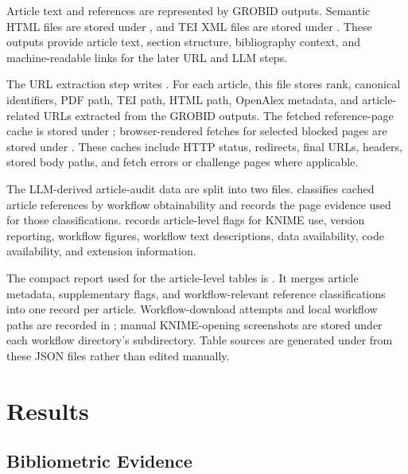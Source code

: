 \documentclass[runningheads]{llncs}
\begin{document}
Article text and references are represented by GROBID outputs. Semantic HTML
files are stored under , and TEI XML files are
stored under . These outputs provide
article text, section structure, bibliography context, and machine-readable
links for the later URL and LLM steps.

The URL extraction step writes
. For each article, this
file stores rank, canonical identifiers, PDF path, TEI path, HTML path,
OpenAlex metadata, and article-related URLs extracted from the GROBID outputs.
The fetched reference-page cache is stored under
; browser-rendered fetches for selected
blocked pages are stored under .
These caches include HTTP status, redirects, final URLs, headers, stored body
paths, and fetch errors or challenge pages where applicable.

The LLM-derived article-audit data are split into two files.
classifies cached article references by workflow obtainability and records the
page evidence used for those classifications.
 records
article-level flags for KNIME use, version reporting, workflow figures,
workflow text descriptions, data availability, code availability, and
extension information.

The compact report used for the article-level tables is
. It merges article
metadata, supplementary flags, and workflow-relevant reference classifications
into one record per article. Workflow-download attempts and local workflow
paths are recorded in
; manual
KNIME-opening screenshots are stored under each workflow directory's
 subdirectory. Table sources are generated under
 from these JSON files rather than edited
manually.

\section{Results}

\subsection{Bibliometric Evidence}
\end{document}

